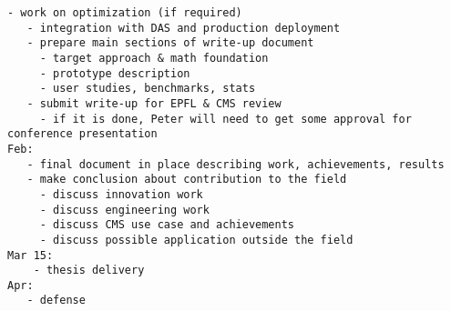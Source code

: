\begin{appendix}
\begin{footnotesize}
\begin{Verbatim}[commandchars=\\\{\}]
   - work on optimization (if required)
   - integration with DAS and production deployment
   - prepare main sections of write-up document
     - target approach & math foundation
     - prototype description
     - user studies, benchmarks, stats
   - submit write-up for EPFL & CMS review
     - if it is done, Peter will need to get some approval for conference presentation
Feb:
   - final document in place describing work, achievements, results
   - make conclusion about contribution to the field
     - discuss innovation work
     - discuss engineering work
     - discuss CMS use case and achievements
     - discuss possible application outside the field
Mar 15:
    - thesis delivery
Apr:
   - defense
\end{Verbatim}
\end{footnotesize}

\end{appendix}